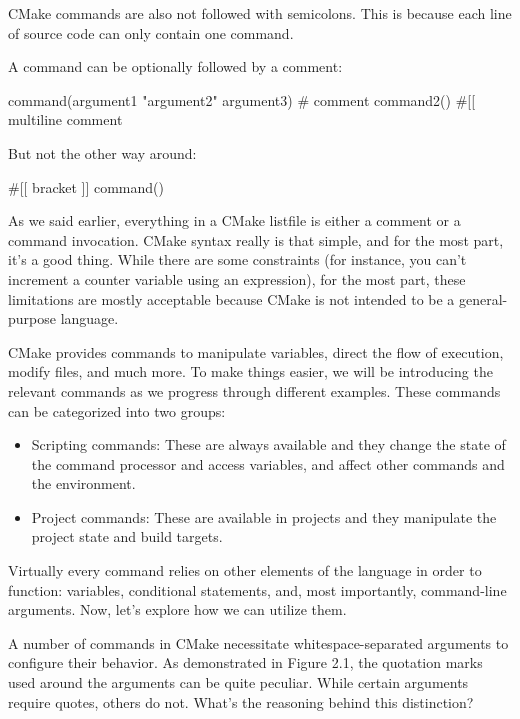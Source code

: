 CMake commands are also not followed with semicolons. This is because each line of source code can only contain one command.

A command can be optionally followed by a comment:

\begin{cmake}
command(argument1 "argument2" argument3) # comment
command2() #[[ multiline comment
\end{cmake}

But not the other way around:

\begin{cmake}
#[[ bracket
]] command()
\end{cmake}

As we said earlier, everything in a CMake listfile is either a comment or a command invocation. CMake syntax really is that simple, and for the most part, it’s a good thing. While there are some constraints (for instance, you can’t increment a counter variable using an expression), for the most part, these limitations are mostly acceptable because CMake is not intended to be a general-purpose language.

CMake provides commands to manipulate variables, direct the flow of execution, modify files, and much more. To make things easier, we will be introducing the relevant commands as we progress through different examples. These commands can be categorized into two groups:

\begin{itemize}
\item
Scripting commands: These are always available and they change the state of the command processor and access variables, and affect other commands and the environment.

\item
Project commands: These are available in projects and they manipulate the project state and build targets.
\end{itemize}

Virtually every command relies on other elements of the language in order to function: variables, conditional statements, and, most importantly, command-line arguments. Now, let’s explore how we can utilize them.


A number of commands in CMake necessitate whitespace-separated arguments to configure their behavior. As demonstrated in Figure 2.1, the quotation marks used around the arguments can be quite peculiar. While certain arguments require quotes, others do not. What’s the reasoning behind this distinction?

